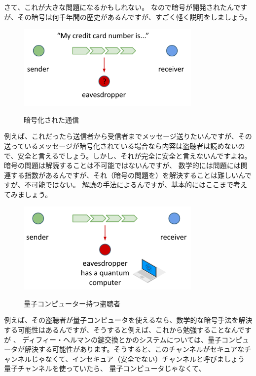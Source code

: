 さて、これが大きな問題になるかもしれない。
なので暗号が開発されたんですが、その暗号は何千年間の歴史があるんですが、すごく軽く説明をしましょう。
\begin{figure}[H]
    \centering
    \includegraphics[width=0.8\textwidth]{lesson1/credit_card_info_eavesdropper.pdf}
    \label{fig: 1}
    \begin{center}
        \caption{暗号化された通信}
    \end{center}
\end{figure}
例えば、これだったら送信者から受信者までメッセージ送りたいんですが、その送っているメッセージが暗号化されている場合なら内容は盗聴者は読めないので、安全と言えるでしょう。しかし、それが完全に安全と言えないんですよね。暗号の問題は解読することは不可能ではないんですが、
数学的には問題には関連する指数があるんですが、それ（暗号の問題を）を解決することは難しいんですが、不可能ではない。
解読の手法によるんですが、基本的にはここまで考えてみましょう。
\begin{figure}[H]
    \centering
    \includegraphics[width=0.8\textwidth]{lesson1/eavesdropper_Q_comp.pdf}
    \label{fig: 1}
    \begin{center}
        \caption{量子コンピューター持つ盗聴者}
    \end{center}
\end{figure}
例えば、その盗聴者が量子コンピュータを使えるなら、数学的な暗号手法を解決する可能性はあるんですが、そうすると例えば、これから勉強することなんですが 、
ディフィー・ヘルマンの鍵交換とかのシステムについては、量子コンピュータが解決する可能性があります。そうすると、このチャンネルがセキュアなチャンネルじゃなくて、インセキュア（安全でない）チャンネルと呼びましょう
量子チャンネルを使っていたら、 量子コンピュータじゃなくて、

